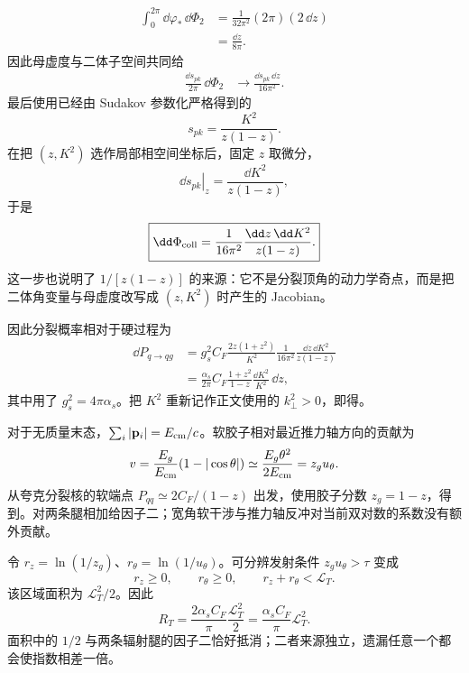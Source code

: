\begin{derivation}[夸克共线发射的分裂概率]
\begin{align*}
 \int_0^{2\pi}\dd\varphi_*\,\dd\Phi_2
 &=\frac{1}{32\pi^2}(2\pi)(2\,\dd z)\\
 &=\frac{\dd z}{8\pi}.
\end{align*}
因此母虚度与二体子空间共同给
\begin{align*}
 \frac{\dd s_{pk}}{2\pi}\,\dd\Phi_2
 &\longrightarrow
 \frac{\dd s_{pk}\,\dd z}{16\pi^2}.
\end{align*}
最后使用已经由 Sudakov 参数化严格得到的
\begin{equation*}
 s_{pk}=\frac{K^2}{z(1-z)}.
\end{equation*}
在把 $(z,K^2)$ 选作局部相空间坐标后，固定 $z$ 取微分，
\begin{equation*}
 \left.\dd s_{pk}\right|_z
 =\frac{\dd K^2}{z(1-z)},
\end{equation*}
于是
\begin{equation*}
 \boxed{
 \dd\Phi_{\rm coll}
 =\frac{1}{16\pi^2}
 \frac{\dd z\,\dd K^2}{z(1-z)}.}
\end{equation*}
这一步也说明了 $1/[z(1-z)]$ 的来源：它不是分裂顶角的动力学奇点，而是把二体角变量与母虚度改写成 $(z,K^2)$ 时产生的 Jacobian。

因此分裂概率相对于硬过程为
\begin{align*}
 \dd P_{q\to qg}
 &=g_s^2C_F\frac{2z(1+z^2)}{K^2}
 \frac{1}{16\pi^2}
 \frac{\dd z\,\dd K^2}{z(1-z)}\\
 &=\frac{\alpha_s}{2\pi}
 C_F\frac{1+z^2}{1-z}
 \frac{\dd K^2}{K^2}\,\dd z,
\end{align*}
其中用了 $g_s^2=4\pi\alpha_s$。把 $K^2$ 重新记作正文使用的 $k_\perp^2>0$，即得。
\end{derivation}

\begin{derivation}[双对数的三角形积分区域]
对于无质量末态，$\sum_i|\mathbf p_i|=E_{\rm cm}/c$。软胶子相对最近推力轴方向的贡献为
\begin{equation*}
 v=\frac{E_g}{E_{\rm cm}}(1-|\cos\theta|)
 \simeq\frac{E_g\theta^2}{2E_{\rm cm}}=z_gu_\theta.
\end{equation*}
从夸克分裂核的软端点 $P_{qq}\simeq2C_F/(1-z)$ 出发，使用胶子分数 $z_g=1-z$，得到。对两条腿相加给因子二；宽角软干涉与推力轴反冲对当前双对数的系数没有额外贡献。

令 $r_z=\ln(1/z_g)$、$r_\theta=\ln(1/u_\theta)$。可分辨发射条件 $z_gu_\theta>\tau$ 变成
\begin{equation*}
 r_z\geq0,\qquad r_\theta\geq0,\qquad r_z+r_\theta<\mathcal L_T.
\end{equation*}
该区域面积为 $\mathcal L_T^2/2$。因此
\begin{equation*}
 R_T=\frac{2\alpha_sC_F}{\pi}\frac{\mathcal L_T^2}{2}
 =\frac{\alpha_sC_F}{\pi}\mathcal L_T^2.
\end{equation*}
面积中的 $1/2$ 与两条辐射腿的因子二恰好抵消；二者来源独立，遗漏任意一个都会使指数相差一倍。
\end{derivation}

